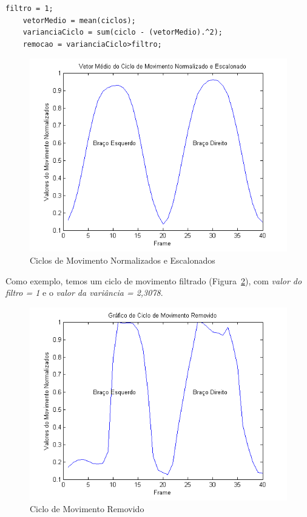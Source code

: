 \begin{description}
\begin{lstlisting}[frame=single, caption=Filtro dos Ciclos]
    filtro = 1;
    vetorMedio = mean(ciclos);
    varianciaCiclo = sum(ciclo - (vetorMedio).^2);
    remocao = varianciaCiclo>filtro;
	\end{lstlisting}
	
	\begin{figure}
     \centering
     \includegraphics[width=1\textwidth]{./img/vetormedionormalozadoescalonado.png}
     \caption{Ciclos de Movimento Normalizados e Escalonados}
		 \label{img:ciclos_normalizado_escalonado}
	\end{figure}
\end{description}


Como exemplo, temos um ciclo de movimento filtrado (Figura~\ref{img:ciclo_filtrado}), com \textit{valor do filtro = 1} e o \textit{valor da variância = 2,3078}.

\begin{figure}[!htb]
     \centering
     \includegraphics[width=1\textwidth]{./img/ciclomovimentoremovido.png}
     \caption{Ciclo de Movimento Removido}
		 \label{img:ciclo_filtrado}
\end{figure}


